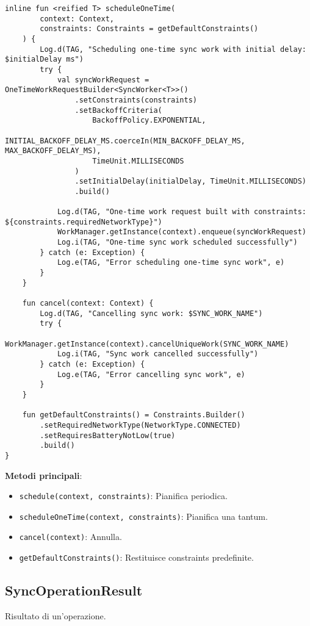 \begin{lstlisting}[caption=SyncOperationScheduler.kt, label=lst:syncoperationscheduler, basicstyle=\ttfamily\scriptsize, breaklines=true, breakatwhitespace=true, tabsize=4, backgroundcolor=\color{codegray}]
    inline fun <reified T> scheduleOneTime(
        context: Context,
        constraints: Constraints = getDefaultConstraints()
    ) {
        Log.d(TAG, "Scheduling one-time sync work with initial delay: $initialDelay ms")
        try {
            val syncWorkRequest = OneTimeWorkRequestBuilder<SyncWorker<T>>()
                .setConstraints(constraints)
                .setBackoffCriteria(
                    BackoffPolicy.EXPONENTIAL,
                    INITIAL_BACKOFF_DELAY_MS.coerceIn(MIN_BACKOFF_DELAY_MS, MAX_BACKOFF_DELAY_MS),
                    TimeUnit.MILLISECONDS
                )
                .setInitialDelay(initialDelay, TimeUnit.MILLISECONDS)
                .build()

            Log.d(TAG, "One-time work request built with constraints: ${constraints.requiredNetworkType}")
            WorkManager.getInstance(context).enqueue(syncWorkRequest)
            Log.i(TAG, "One-time sync work scheduled successfully")
        } catch (e: Exception) {
            Log.e(TAG, "Error scheduling one-time sync work", e)
        }
    }

    fun cancel(context: Context) {
        Log.d(TAG, "Cancelling sync work: $SYNC_WORK_NAME")
        try {
            WorkManager.getInstance(context).cancelUniqueWork(SYNC_WORK_NAME)
            Log.i(TAG, "Sync work cancelled successfully")
        } catch (e: Exception) {
            Log.e(TAG, "Error cancelling sync work", e)
        }
    }

    fun getDefaultConstraints() = Constraints.Builder()
        .setRequiredNetworkType(NetworkType.CONNECTED)
        .setRequiresBatteryNotLow(true)
        .build()
}
\end{lstlisting}

\textbf{Metodi principali}:
\begin{itemize}
    \item \texttt{schedule(context, constraints)}: Pianifica periodica.
    \item \texttt{scheduleOneTime(context, constraints)}: Pianifica una tantum.
    \item \texttt{cancel(context)}: Annulla.
    \item \texttt{getDefaultConstraints()}: Restituisce constraints predefinite.
\end{itemize}

\subsection{SyncOperationResult}\label{subsec:syncoperationresult} Risultato di un'operazione.

